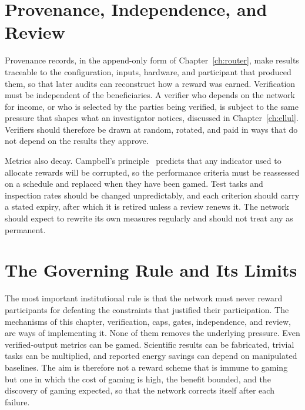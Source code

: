 \section{Provenance, Independence, and Review}

Provenance records, in the append-only form of Chapter~\ref{ch:router}, make results traceable to the configuration, inputs, hardware, and participant that produced them, so that later audits can reconstruct how a reward was earned. Verification must be independent of the beneficiaries. A verifier who depends on the network for income, or who is selected by the parties being verified, is subject to the same pressure that shapes what an investigator notices, discussed in Chapter~\ref{ch:ellul}. Verifiers should therefore be drawn at random, rotated, and paid in ways that do not depend on the results they approve.

Metrics also decay. Campbell's principle~\cite{campbell1979} predicts that any indicator used to allocate rewards will be corrupted, so the performance criteria must be reassessed on a schedule and replaced when they have been gamed. Test tasks and inspection rates should be changed unpredictably, and each criterion should carry a stated expiry, after which it is retired unless a review renews it. The network should expect to rewrite its own measures regularly and should not treat any as permanent.

\section{The Governing Rule and Its Limits}

The most important institutional rule is that the network must never reward participants for defeating the constraints that justified their participation. The mechanisms of this chapter, verification, caps, gates, independence, and review, are ways of implementing it. None of them removes the underlying pressure. Even verified-output metrics can be gamed. Scientific results can be fabricated, trivial tasks can be multiplied, and reported energy savings can depend on manipulated baselines. The aim is therefore not a reward scheme that is immune to gaming but one in which the cost of gaming is high, the benefit bounded, and the discovery of gaming expected, so that the network corrects itself after each failure.
